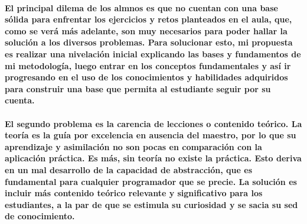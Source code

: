 \documentclass[a4paper, 12pt]{article}
\begin{document}
    \paragraph{
        El principal dilema de los almnos es que no cuentan con una base sólida para enfrentar los ejercicios y retos planteados en el aula, 
        que, como se verá más adelante, son muy necesarios para poder hallar la solución a los diversos problemas. Para solucionar esto, 
        mi propuesta es realizar una nivelación inicial explicando las bases y fundamentos de mi metodología, luego entrar en los conceptos 
        fundamentales y así ir progresando en el uso de los conocimientos y habilidades adquiridos para construir una base que permita al 
        estudiante seguir por su cuenta.
    }
    \paragraph{
        El segundo problema es la carencia de lecciones o contenido teórico. La teoría es la guía por excelencia en ausencia del maestro, 
        por lo que su aprendizaje y asimilación no son pocas en comparación con la aplicación práctica. Es más, sin teoría no existe la 
        práctica. Esto deriva en un mal desarrollo de la capacidad de abstracción, que es fundamental para cualquier programador que se 
        precie. La solución es incluir más contenido teórico relevante y significativo para los estudiantes, a la par de que se estimula 
        su curiosidad y se sacia su sed de conocimiento.
    }
\end{document}
